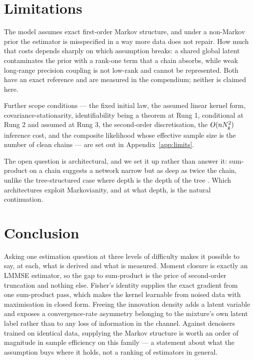 \documentclass{article}
\begin{document}
\section{Limitations}
\label{sec:limits}

The model assumes exact first-order Markov structure, and under a non-Markov prior the estimator
is misspecified in a way more data does not repair. How much that costs depends sharply on which
assumption breaks: a shared global latent contaminates the prior with a rank-one term that a chain
absorbs, while weak long-range precision coupling is not low-rank and cannot be represented. Both
have an exact reference and are measured in the compendium; neither is claimed here.

Further scope conditions --- the fixed initial law, the assumed linear kernel form,
covariance-stationarity, identifiability being a theorem at Rung 1, conditional at Rung 2 and
assumed at Rung 3, the second-order discretisation, the $O(nN_{\mathrm{g}}^{2})$ inference cost, and
the composite likelihood whose effective sample size is the number of clean chains --- are set out
in Appendix~\ref{app:limits}.

The open question is architectural, and we set it up rather than answer it: sum-product on a chain
suggests a network narrow but as deep as twice the chain, unlike the tree-structured case where
depth is the depth of the tree \citep{mei2024unet,garnierbrun2024transformers}. Which architectures
exploit Markovianity, and at what depth, is the natural continuation.

\section{Conclusion}

Asking one estimation question at three levels of difficulty makes it possible to say, at each,
what is derived and what is measured. Moment closure is exactly an LMMSE estimator, so the gap to
sum-product is the price of second-order truncation and nothing else. Fisher's identity supplies
the exact gradient from one sum-product pass, which makes the kernel learnable from noised data
with maximisation in closed form. Freeing the innovation density adds a latent variable and
exposes a convergence-rate asymmetry belonging to the mixture's own latent label rather than to any
loss of information in the channel. Against denoisers trained on identical data, supplying
the Markov structure is worth an order of magnitude in sample efficiency on this family --- a
statement about what the assumption buys where it holds, not a ranking of estimators in general.

\label{LastMainPage}



\clearpage
\appendix

\end{document}
